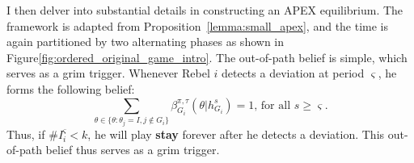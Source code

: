 \documentclass[12pt,letter]{article}
\theoremstyle{definition}
\theoremstyle{remark}
\theoremstyle{claim}
\begin{document}


I then delver into substantial details in constructing an APEX equilibrium. The framework is adapted from Proposition~\ref{lemma:small_apex}, and the time is again partitioned by two alternating phases as shown in Figure\ref{fig:ordered_original_game_intro}. The out-of-path belief is simple, which serves as a grim trigger. Whenever Rebel $i$ detects a deviation at period $\varsigma$, he forms the following belief: 
\begin{equation}
\label{eq_grim_trigger}
\sum_{\theta \in \{\theta:\theta_j=I,j\notin G_i\}}\beta^{\pi,\tau}_{G_i}({\theta}|h^{s}_{G_i})=1 \text{, for all $s\geq \varsigma$}.
\end{equation}
Thus, if $\# I^{\varsigma}_i<k$, he will play \textbf{stay} forever after he detects a deviation. This out-of-path belief thus serves as a grim trigger. 

\end{document}

